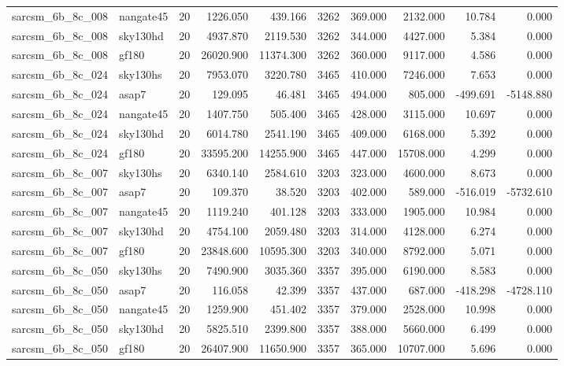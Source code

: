 \begin{tabular}{llrrrrrrrr}
sarcsm\_6b\_8c\_008 & nangate45 & 20 & 1226.050 & 439.166 & 3262 & 369.000 & 2132.000 & 10.784 & 0.000 \\
sarcsm\_6b\_8c\_008 & sky130hd & 20 & 4937.870 & 2119.530 & 3262 & 344.000 & 4427.000 & 5.384 & 0.000 \\
sarcsm\_6b\_8c\_008 & gf180 & 20 & 26020.900 & 11374.300 & 3262 & 360.000 & 9117.000 & 4.586 & 0.000 \\
sarcsm\_6b\_8c\_024 & sky130hs & 20 & 7953.070 & 3220.780 & 3465 & 410.000 & 7246.000 & 7.653 & 0.000 \\
sarcsm\_6b\_8c\_024 & asap7 & 20 & 129.095 & 46.481 & 3465 & 494.000 & 805.000 & -499.691 & -5148.880 \\
sarcsm\_6b\_8c\_024 & nangate45 & 20 & 1407.750 & 505.400 & 3465 & 428.000 & 3115.000 & 10.697 & 0.000 \\
sarcsm\_6b\_8c\_024 & sky130hd & 20 & 6014.780 & 2541.190 & 3465 & 409.000 & 6168.000 & 5.392 & 0.000 \\
sarcsm\_6b\_8c\_024 & gf180 & 20 & 33595.200 & 14255.900 & 3465 & 447.000 & 15708.000 & 4.299 & 0.000 \\
sarcsm\_6b\_8c\_007 & sky130hs & 20 & 6340.140 & 2584.610 & 3203 & 323.000 & 4600.000 & 8.673 & 0.000 \\
sarcsm\_6b\_8c\_007 & asap7 & 20 & 109.370 & 38.520 & 3203 & 402.000 & 589.000 & -516.019 & -5732.610 \\
sarcsm\_6b\_8c\_007 & nangate45 & 20 & 1119.240 & 401.128 & 3203 & 333.000 & 1905.000 & 10.984 & 0.000 \\
sarcsm\_6b\_8c\_007 & sky130hd & 20 & 4754.100 & 2059.480 & 3203 & 314.000 & 4128.000 & 6.274 & 0.000 \\
sarcsm\_6b\_8c\_007 & gf180 & 20 & 23848.600 & 10595.300 & 3203 & 340.000 & 8792.000 & 5.071 & 0.000 \\
sarcsm\_6b\_8c\_050 & sky130hs & 20 & 7490.900 & 3035.360 & 3357 & 395.000 & 6190.000 & 8.583 & 0.000 \\
sarcsm\_6b\_8c\_050 & asap7 & 20 & 116.058 & 42.399 & 3357 & 437.000 & 687.000 & -418.298 & -4728.110 \\
sarcsm\_6b\_8c\_050 & nangate45 & 20 & 1259.900 & 451.402 & 3357 & 379.000 & 2528.000 & 10.998 & 0.000 \\
sarcsm\_6b\_8c\_050 & sky130hd & 20 & 5825.510 & 2399.800 & 3357 & 388.000 & 5660.000 & 6.499 & 0.000 \\
sarcsm\_6b\_8c\_050 & gf180 & 20 & 26407.900 & 11650.900 & 3357 & 365.000 & 10707.000 & 5.696 & 0.000 \\

\end{tabular}
